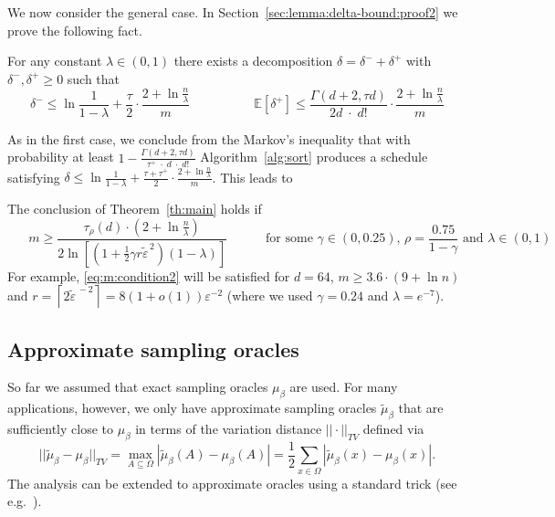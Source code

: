 \documentclass[final,12pt]{colt2018}
\def\myparagraph#1{\vspace{2pt}\noindent{\bf #1~~}}
\def\E{{\mathbb E}}
\begin{document}
\myparagraph{\fbox{Case II: $H(x)\in \{0\}\cup[1,n]$ for all $x\in\Omega$}} 
We now consider the general case. In Section~\ref{sec:lemma:delta-bound:proof2} we prove the following fact.
\begin{lemma}\label{lemma:delta-bound2}
For any constant $\lambda\in(0,1)$ there exists a decomposition $\delta=\delta^-+\delta^+$ with $\delta^-,\delta^+\ge 0$
such that 
$$
\delta^-\le\ln\frac{1}{1-\lambda}+\frac{\tau}2\cdot\frac{2+\ln \frac n\lambda}m 
\qquad\qquad\quad
\E[\delta^+]\le  \frac{\Gamma(d+2,\tau d)}{2d\;\cdot \;d!}\cdot\frac{2+\ln \frac n\lambda}m
$$
\end{lemma}
As in the first case, we conclude from the Markov's inequality  that with probability at least 
$1- \frac{\Gamma(d+2,\tau d)}{\tau^+\;\cdot\; d\;\cdot \;d!}$ Algorithm~\ref{alg:sort}
produces a schedule satisfying $\delta \le \ln\frac{1}{1-\lambda}+\frac{\tau+\tau^+}2\cdot\frac{2+\ln \frac{n}\lambda}m$.
This leads to
\begin{theorem} \label{th:main2}
The conclusion of Theorem~\ref{th:main} holds if 
\begin{equation}
\hspace{20pt}m \ge \frac{\tau_\rho(d)\cdot (2+\ln \frac{n}\lambda)}{2 \ln\left[\left(\mbox{$1+\frac{1}{2}$}\gamma  r\tilde\varepsilon^{\,2}\right)(1-\lambda)\right]}
\qquad\quad\mbox{for some }\gamma\in(0,0.25)\mbox{, $\rho=\frac{0.75}{1-\gamma}$ and $\lambda\in(0,1)$}
\label{eq:m:condition2}
\end{equation}
For example, \eqref{eq:m:condition2} will be satisfied for
$d=64$,
$m\ge 3.6 \cdot (9+\ln n)$
and
$
r=\left\lceil 2\tilde\varepsilon^{\,-2}\right\rceil=8(1+o(1))\varepsilon^{-2}
$ (where we used $\gamma=0.24$ and $\lambda=e^{-7}$).
\end{theorem}














\subsection{Approximate sampling oracles}\label{sec:approx}
So far we assumed that exact sampling oracles $\mu_\beta$ are used.
For many applications, however, we only have approximate sampling oracles $\tilde\mu_\beta$ 
that are sufficiently close to $\mu_\beta$ in terms of the variation distance $||\cdot||_{TV}$ defined via
$$
||\tilde\mu_\beta-\mu_\beta||_{TV}=\max_{A\subseteq \Omega} |\tilde\mu_\beta(A)-\mu_\beta(A)|=\frac{1}{2} \sum_{x\in\Omega}|\tilde\mu_\beta(x)-\mu_\beta(x)|.
$$
The analysis can be extended to approximate oracles using a standard trick (see e.g.\ \cite[Remark 5.9]{Stefankovic:JACM09}).
\end{document}
